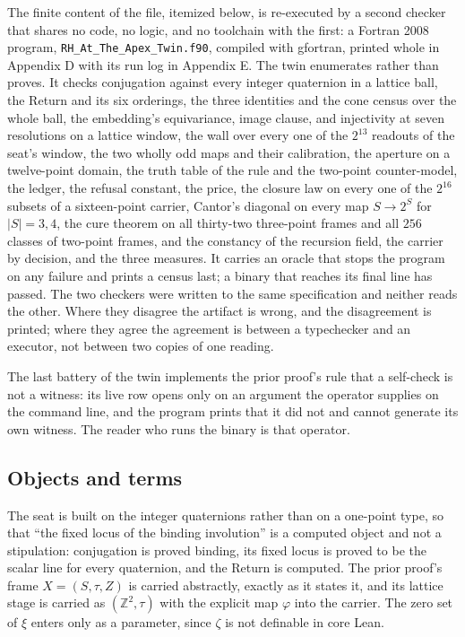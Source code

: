 \documentclass[10pt,twocolumn]{article}
\begin{document}
The finite content of the file, itemized below, is re-executed by a
second checker that shares no code, no logic, and no toolchain with the
first: a Fortran 2008 program, \texttt{RH\_At\_The\_Apex\_Twin.f90},
compiled with gfortran, printed whole in Appendix D with its run log in
Appendix E. The twin enumerates rather than proves. It checks
conjugation against every integer quaternion in a lattice ball, the
Return and its six orderings, the three identities and the cone census
over the whole ball, the embedding's equivariance, image clause, and
injectivity at seven resolutions on a lattice window, the wall over
every one of the \(2^{13}\) readouts of the seat's window, the two
wholly odd maps and their calibration, the aperture on a twelve-point
domain, the truth table of the rule and the two-point counter-model, the
ledger, the refusal constant, the price, the closure law on every one of
the \(2^{16}\) subsets of a sixteen-point carrier, Cantor's diagonal on
every map \(S \to 2^S\) for \(|S| = 3, 4\), the cure theorem on all
thirty-two three-point frames and all \(256\) classes of two-point
frames, and the constancy of the recursion field, the carrier by
decision, and the three measures. It carries an oracle that stops the
program on any failure and prints a census last; a binary that reaches
its final line has passed. The two checkers were written to the same
specification and neither reads the other. Where they disagree the
artifact is wrong, and the disagreement is printed; where they agree the
agreement is between a typechecker and an executor, not between two
copies of one reading.

The last battery of the twin implements the prior proof's rule that a
self-check is not a witness: its live row opens only on an argument the
operator supplies on the command line, and the program prints that it
did not and cannot generate its own witness. The reader who runs the
binary is that operator.

\hypertarget{objects-and-terms}{%
\subsection{Objects and terms}\label{objects-and-terms}}

The seat is built on the integer quaternions rather than on a one-point
type, so that ``the fixed locus of the binding involution'' is a
computed object and not a stipulation: conjugation is proved binding,
its fixed locus is proved to be the scalar line for every quaternion,
and the Return is computed. The prior proof's frame \(X = (S, \tau, Z)\)
is carried abstractly, exactly as it states it, and its lattice stage is
carried as \((\mathbb{Z}^2, \tau)\) with the explicit map \(\varphi\)
into the carrier. The zero set of \(\xi\) enters only as a parameter,
since \(\zeta\) is not definable in core Lean.
\end{document}
